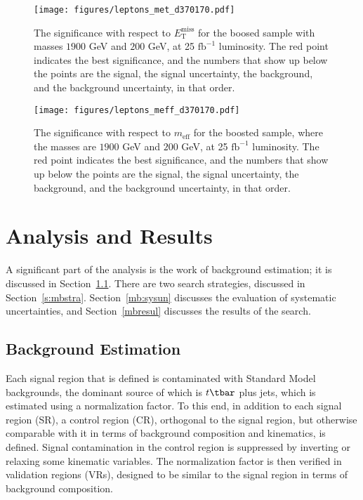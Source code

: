 \begin{figure}[H]
	\texttt{[image: figures/leptons\_met\_d370170.pdf]}
	\centering

	\caption{The significance with respect to $E_{\text{T}}^{\text{miss}}$ for the
		boosed sample with masses $1900$ GeV and $200$ GeV, at 25 $\text{fb}^{-1}$
		luminosity. The red point indicates the best significance, and the numbers that
		show up below the points are the signal, the signal uncertainty, the
		background, and the background uncertainty, in that order.}

	\label{f:mbmetsop}
\end{figure}


\begin{figure}[H]
	\texttt{[image: figures/leptons\_meff\_d370170.pdf]}
	\centering

	\caption{The significance with respect to $m_{\text{eff}}$ for the boosted
		sample, where the masses are $1900$ GeV and $200$ GeV, at 25 $\text{fb}^{-1}$
		luminosity. The red point indicates the best significance, and the numbers that
		show up below the points are the signal, the signal uncertainty, the
		background, and the background uncertainty, in that order.}

	\label{f:mbmeffsop}
\end{figure}


\section{Analysis and Results}\label{mbbganal}

A significant part of the analysis is the work of background estimation; it is
discussed in Section~\ref{s:mbbg}. There are two search strategies, discussed
in Section~\ref{s:mbstra}. Section~\ref{mb:sysun} discusses the evaluation of
systematic uncertainties, and Section~\ref{mbresul} discusses the results of
the search.

\subsection{Background Estimation}\label{s:mbbg}

Each signal region that is defined is contaminated with Standard Model
backgrounds, the dominant source of which is $t\tbar$ plus jets, which is
estimated using a normalization factor. To this end, in addition to each signal
region (SR), a control region (CR), orthogonal to the signal region, but 
otherwise comparable with it in terms of background composition and kinematics,
is defined. Signal contamination in the control region is suppressed by
inverting or relaxing some kinematic variables. The normalization factor is
then verified in validation regions (VRs), designed to be similar to the signal
region in terms of background composition.

